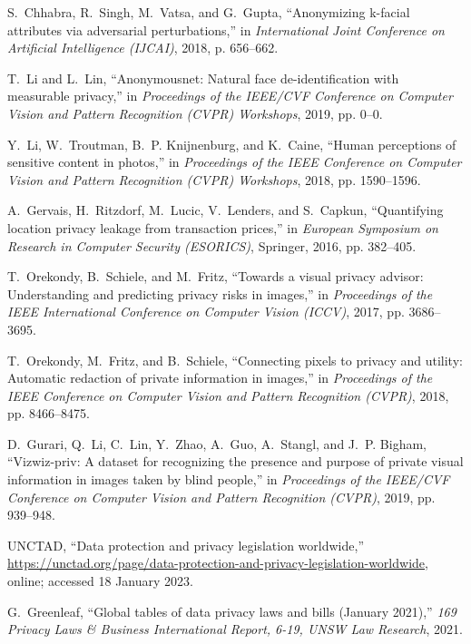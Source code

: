 \documentclass[journal]{IEEEtran}
\begin{document}
\begin{thebibliography}{100}
S.~Chhabra, R.~Singh, M.~Vatsa, and G.~Gupta, ``Anonymizing k-facial attributes via adversarial perturbations,'' in \emph{International Joint Conference on Artificial Intelligence (IJCAI)}, 2018, p. 656–662.

T.~Li and L.~Lin, ``Anonymousnet: Natural face de-identification with measurable privacy,'' in \emph{Proceedings of the IEEE/CVF Conference on
  Computer Vision and Pattern Recognition (CVPR) Workshops}, 2019, pp. 0--0.

Y.~Li, W.~Troutman, B.~P. Knijnenburg, and K.~Caine, ``Human perceptions of
  sensitive content in photos,'' in \emph{Proceedings of the IEEE Conference on Computer Vision and Pattern Recognition (CVPR) Workshops}, 2018, pp. 1590--1596.

A.~Gervais, H.~Ritzdorf, M.~Lucic, V.~Lenders, and S.~Capkun, ``Quantifying location privacy leakage from transaction prices,'' in \emph{European Symposium on Research in Computer Security (ESORICS)}, Springer, 2016, pp. 382--405.

T.~Orekondy, B.~Schiele, and M.~Fritz, ``Towards a visual privacy advisor:
  Understanding and predicting privacy risks in images,'' in \emph{Proceedings of the IEEE International Conference on Computer Vision (ICCV)}, 2017, pp. 3686--3695.

T.~Orekondy, M.~Fritz, and B.~Schiele, ``Connecting pixels to privacy and
  utility: Automatic redaction of private information in images,'' in
  \emph{Proceedings of the IEEE Conference on Computer Vision and Pattern Recognition (CVPR)}, 2018, pp. 8466--8475.

D.~Gurari, Q.~Li, C.~Lin, Y.~Zhao, A.~Guo, A.~Stangl, and J.~P. Bigham,
  ``Vizwiz-priv: A dataset for recognizing the presence and purpose of private visual information in images taken by blind people,'' in \emph{Proceedings of
  the IEEE/CVF Conference on Computer Vision and Pattern Recognition (CVPR)}, 2019, pp. 939--948.

UNCTAD, ``Data protection and privacy legislation worldwide,''
  \url{https://unctad.org/page/data-protection-and-privacy-legislation-worldwide},
  online; accessed 18 January 2023.

G.~Greenleaf, ``Global tables of data privacy laws and bills (January 2021),''
  \emph{169 Privacy Laws \& Business International Report, 6-19, UNSW Law
  Research}, 2021.


\end{thebibliography}
\end{document}
